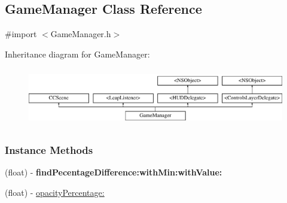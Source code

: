 \hypertarget{interface_game_manager}{\subsection{Game\-Manager Class Reference}
\label{d4/d94/interface_game_manager}
}


{\ttfamily \#import $<$Game\-Manager.\-h$>$}

Inheritance diagram for Game\-Manager\-:\begin{figure}[H]
\begin{center}
\leavevmode
\includegraphics[height=2.560976cm]{d4/d94/interface_game_manager}
\end{center}
\end{figure}
\subsubsection*{Instance Methods}
\begin{DoxyCompactItemize}
\item 
\hypertarget{interface_game_manager_a7071b8391346173da0beeac17ea27310}{(float) -\/ {\bfseries find\-Pecentage\-Difference\-:with\-Min\-:with\-Value\-:}}\label{d4/d94/interface_game_manager_a7071b8391346173da0beeac17ea27310}

\item 
(float) -\/ \hyperlink{interface_game_manager_a0acb835edfa002c4c66a92d02376bd0b}{opacity\-Percentage\-:}
\end{DoxyCompactItemize}
